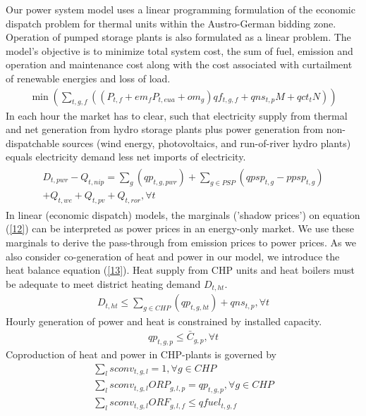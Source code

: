\documentclass[11pt,a4paper]{article}
\begin{document}
Our power system model uses a linear programming formulation of the economic dispatch problem for thermal units within the Austro-German bidding zone. Operation of pumped storage plants is also formulated as a linear problem.
The model's objective is to minimize total system cost, the sum of fuel, emission and operation and maintenance cost along with the cost associated with curtailment of renewable energies and loss of load.
\begin{align}
\min \left(\sum_{t,g,f}\left(\left(P_{t,f} + em_{f} P_{t,eua}+om_{g}\right) qf_{t,g,f} + qns_{t,p} M + qct_{t} N \right) \right)
\end{align}
In each hour the market has to clear, such that electricity supply from thermal and net generation from hydro storage plants plus power generation from non-dispatchable sources (wind energy, photovoltaics, and run-of-river hydro plants) equals electricity demand less net imports of electricity.
\begin{align}\label{12}
\begin{split}
D_{t,pwr} - Q_{t,nip} = \sum_{g} \left(q p_{t,g,pwr} \right) + \sum_{g\in PSP} \left(qpsp_{t,g} - ppsp_{t,g} \right) \\
+ Q_{t,we} + Q_{t,pv} + Q_{t,ror}, \forall t
\end{split}
\end{align}
In linear (economic dispatch) models, the marginals ('shadow prices') on equation (\ref{12}) can be interpreted as power prices in an energy-only market. We use these marginals to derive the pass-through from emission prices to power prices.
As we also consider co-generation of heat and power in our model, we introduce the heat balance equation (\ref{13}). Heat supply from CHP units and heat boilers must be adequate to meet district heating demand $D_{t,ht}$.
\begin{align}\label{13}
D_{t,ht} \leq \sum_{g \in CHP} \left( qp_{t,g,ht} \right) + qns_{t,p}, \forall t
\end{align}
Hourly generation of power and heat is constrained by installed capacity. 
\begin{align}
qp_{t,g,p} \leq \bar{C}_{g,p}, \forall t
\end{align}
Coproduction of heat and power in CHP-plants is governed by
\begin{align}
\sum_{l} sconv_{t,g,l} = 1, \forall g \in CHP \\
\sum_{l} sconv_{t,g,l} ORP_{g,l,p} = qp_{t,g,p}, \forall g \in CHP \\
\sum_{l} sconv_{t,g,l} ORF_{g,l,f} \leq qfuel_{t,g,f}
\end{align}
\end{document}
